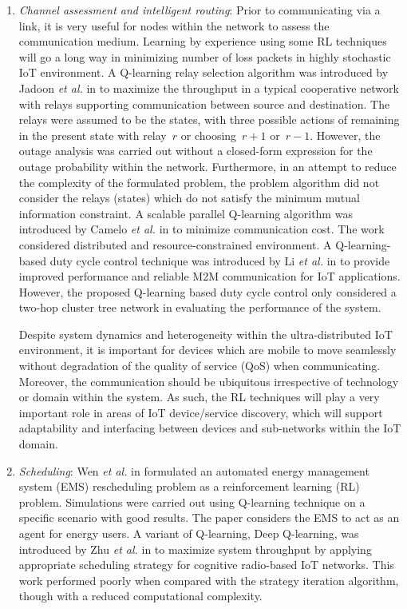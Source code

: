 \documentclass[journal]{IEEEtran}
\begin{document}
\begin{enumerate}[leftmargin=*,label= \arabic*)]
      \item \textit{Channel assessment and intelligent routing}: Prior to communicating via a link, it is very useful for nodes within the network to assess the communication medium. Learning by experience using some RL techniques will go a long way in minimizing number of loss packets in highly stochastic IoT environment. A Q-learning relay selection algorithm was introduced by Jadoon \emph{et al.} in \cite{Jadoon2017} to maximize the throughput in a typical cooperative network with relays supporting communication between source and destination. The relays were assumed to be the states, with three possible actions of remaining in the present state with relay~$r$ or choosing~$r + 1$ or~$r - 1$. However, the outage analysis was carried out without a closed-form expression for the outage probability within the network. Furthermore, in an attempt to reduce the complexity of the formulated problem, the problem algorithm did not consider the relays (states) which do not satisfy the minimum mutual information constraint. A scalable parallel Q-learning algorithm was introduced by Camelo \emph{et al.} in \cite{Camelo2016} to minimize communication cost. The work considered distributed and resource-constrained environment. A Q-learning-based duty cycle control technique was introduced by Li \emph{et al.} in \cite{Li2015} to provide improved performance and reliable M2M communication for IoT applications. However, the proposed Q-learning based duty cycle control only considered a two-hop cluster tree network in evaluating the performance of the system.

          Despite system dynamics and heterogeneity within the ultra-distributed IoT environment, it is important for devices which are mobile to move seamlessly without degradation of the quality of service (QoS) when communicating. Moreover, the communication should be ubiquitous irrespective of technology or domain within the system. As such, the RL techniques will play a very important role in areas of IoT device/service discovery, which will support adaptability and interfacing between devices and sub-networks within the IoT domain.

      \item \textit{Scheduling}: Wen \emph{et al.} in \cite{Wen15} formulated an automated energy management system (EMS) rescheduling problem as a reinforcement learning (RL) problem. Simulations were carried out using Q-learning technique on a specific scenario with good results. The paper considers the EMS to act as an agent for energy users. A variant of Q-learning, Deep Q-learning, was introduced by Zhu \emph{et al.} in \cite{Zhu2018} to maximize system throughput by applying appropriate scheduling strategy for cognitive radio-based IoT networks. This work performed poorly when compared with the strategy iteration algorithm, though with a reduced computational complexity.


\end{enumerate}
\end{document}
